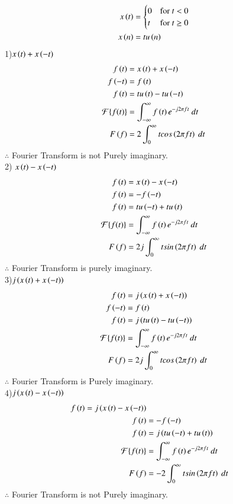 \documentclass[journal,12pt,twocolumn]{IEEEtran}
\theoremstyle{remark}
\begin{document}
\begin{align} 
x\left(t\right) &= 
\begin{cases} 
0 & \text{for } t < 0 \\
t & \text{for } t \geq 0 
\end{cases}\\
x\left(n\right)&=t u\left(n\right)
\end{align}
1)$x\left(t\right) + x\left(-t\right)$
\begin{align}
  f\left(t\right)&= x\left(t\right) + x\left(-t\right)\\
  f\left(-t\right)&=f\left(t\right)\\
  f\left(t\right) &= t u\left(t\right)-t u\left(-t\right)\\
  \mathcal{F}\{f(t)\}&=\int_{-\infty}^{\infty} f\left(t\right) e^{-j 2\pi f t} \ dt\\
  F\left(f\right)&=2\int_{0}^{\infty} t  cos\left(2\pi ft\right)  \ dt
\end{align}
$\therefore$ Fourier Transform is not Purely imaginary.\\
2) $x\left(t\right) - x\left(-t\right)$
\begin{align}
  f\left(t\right)&= x\left(t\right) - x\left(-t\right)\\
f\left(t\right)&=-f\left(-t\right)\\
 f\left(t\right) &= t u\left(-t\right)+ t u\left(t\right)\\
  \mathcal{F}\{f(t)\}&=\int_{-\infty}^{\infty} f\left(t\right) e^{-j 2\pi f t} \ dt\\
  F\left(f\right)&=2j\int_{0}^{\infty} t  sin\left(2\pi ft\right)  \ dt
\end{align}
$\therefore$ Fourier Transform is purely imaginary.\\
3)$j\left(x\left(t\right) + x\left(-t\right)\right)$
\begin{align}
  f\left(t\right)&= j\left(x\left(t\right) + x\left(-t\right)\right)\\
  f\left(-t\right)&=f\left(t\right)\\
  f\left(t\right) &= j\left(t u\left(t\right)-t u\left(-t\right)\right)\\
  \mathcal{F}\{f(t)\}&=\int_{-\infty}^{\infty} f\left(t\right) e^{-j 2\pi f t} \ dt\\
  F\left(f\right)&=2j\int_{0}^{\infty} t  cos\left(2\pi ft\right)  \ dt
\end{align}
$\therefore$ Fourier Transform is Purely imaginary.\\
4)$j\left(x\left(t\right) - x\left(-t\right)\right)$
\begin{align}
  f\left(t\right)=j\left(x\left(t\right) - x\left(-t\right)\right)\\
f\left(t\right)&=-f\left(-t\right)\\
f\left(t\right)&=j\left(t u\left(-t\right)+ t u\left(t\right)\right)\\
  \mathcal{F}\{f(t)\}&=\int_{-\infty}^{\infty} f\left(t\right) e^{-j 2\pi f t} \ dt\\
  F\left(f\right)&=-2\int_{0}^{\infty} t  sin\left(2\pi ft\right)  \ dt
\end{align}
$\therefore$ Fourier Transform is not Purely imaginary.\\
\end{document}

